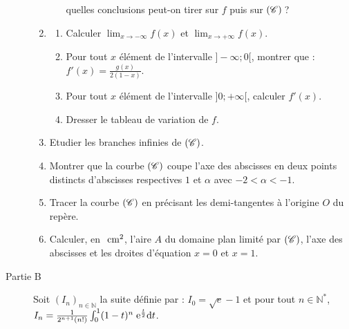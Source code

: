 \begin{description}
\begin{enumerate}
\begin{enumerate}
                                          quelles conclusions peut-on tirer sur $f$ puis sur $\Courbe$\,?
                              \end{enumerate}
                        \item \begin{enumerate}
                                    \item Calculer 
                                          $\displaystyle{
                                          \lim_{x\rightarrow -\infty } f(x)
                                          }$
                                          et
                                          $\displaystyle{
                                          \lim_{x\rightarrow +\infty } f(x)
                                          }$.
                                    \item Pour tout $x$ \'el\'ement de l'intervalle $]-\infty ; 0[$, montrer que : 
                                          $f'(x) = \frac{g(x)}{2 (1-x)}$.
                                    \item Pour tout $x$ élément de l’intervalle $]0;+\infty[$, calculer $f'(x)$.
                                    \item Dresser le tableau de variation de $f$.
                              \end{enumerate}
                        \item Etudier les branches infinies de $\Courbe$.
                        \item Montrer que la courbe $\Courbe$ coupe l'axe des abscisses en deux points distincts 
                              d'abscisses respectives $1$ et $\alpha$ avec $-2 < \alpha < -1$.
                        \item Tracer la courbe $\Courbe$ en pr\'ecisant les demi-tangentes \`a l'origine $O$ du rep\`ere.
                        \item Calculer, en $~\mathrm{cm}^2$, l'aire $A$ du domaine plan limit\'e par $\Courbe$, l'axe des
                              abscisses et les droites d'\'equation $x = 0$ et $x = 1$.
                  \end{enumerate}
            \item[Partie B]
                  Soit $(I_n)_{n\in\mathbb{N}}$ la suite d\'efinie par : $I_0 = \sqrt{e} - 1$ et 
                  pour tout $n \in \mathbb{N}^*$, 
                  $I_n = \frac{1}{2^{n+1} (n!)} \int_{0}^{1} (1-t)^n \; \mathrm{e}^{\frac{t}{2}} \mathrm{d}t$.
                  \begin{enumerate}

\end{enumerate}
\end{description}
